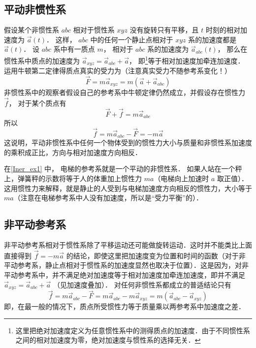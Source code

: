 \subsection{平动非惯性系}
假设某个非惯性系 $abc$ 相对于惯性系 $xyz$ 没有旋转只有平移，且 $t$ 时刻的相对加速度为 $\vec a(t)$． 这样， $abc$ 中的任何一个静止点相对于 $xyz$ 系的加速度都是 $\vec a(t)$． 设 $abc$ 系中有一质点 $m$， 相对于 $abc$ 系的加速度为 $\vec a_{abc} (t)$， 那么在惯性系中质点的加速度为 $\vec a_{xyz} = \vec a_{abc} + \vec a$， 即\footnote{这里把绝对加速度定义为任意惯性系中的测得质点的加速度．由于不同惯性系之间的相对加速度为零，绝对加速度与惯性系的选择无关．}等于相对加速度加牵连加速度． 运用牛顿第二定律得质点真实的受力为（注意真实受力不随参考系变化！）
\begin{equation}
\vec F = m \vec a_{xyz} = m(\vec a + \vec a_{abc} )
\end{equation}
非惯性系中的观察者假设自己的参考系中牛顿定律仍然成立，并假设存在惯性力 $\vec f$， 对于某个质点有
\begin{equation}
\vec F + \vec f = m \vec a_{abc}
\end{equation}
所以
\begin{equation}
\vec f = m \vec a_{abc} - \vec F =  - m\vec a
\end{equation}
这说明，平动非惯性系中任何一个物体受到的惯性力大小与质量和非惯性系加速度的乘积成正比，方向与相对加速度方向相反．

在\autoref{Iner_ex1} 中， 电梯的参考系就是一个平动的非惯性系． 如果人站在一个秤上，弹簧秤的示数将等于人的体重加上惯性力 $ma$（电梯向上加速时 $a$ 取正值）． 这用惯性力来解释，就是静止的人受到与电梯加速度方向相反的惯性力，大小等于 $ma$（注意在电梯参考系中人没有加速度，所以是“受力平衡”的）．

\subsection{非平动参考系}

非平动参考系相对于惯性系除了平移运动还可能做旋转运动．这时并不能类比上面直接得到 $\vec f =  - m\vec a$ 的结论，即使这里把加速度变为位置和时间的函数（对于非平动参考系，静止点相对于惯性系的加速度显然也取决于位置）．这是因为，对非平动参考系中，并不满足绝对加速度等于相对加速度加牵连加速度，即并不满足 $\vec a_{xyz} = \vec a_{abc} + \vec a$ （见加速度叠加）． %
对任何非惯性系都成立的普适结论只有
\begin{equation}
\vec f = m \vec a_{abc} - \vec F = m \vec a_{abc} - m \vec a_{xyz} = m( \vec a_{abc} - \vec a_{xyz})
\end{equation}
即，在最一般的情况下，质点所受惯性力等于质量乘以两参考系中加速度之差．

